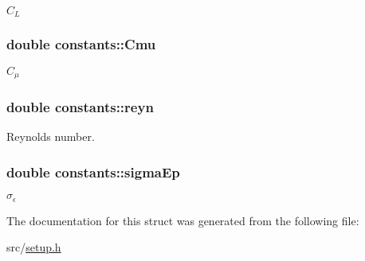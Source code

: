 \label{structconstants_a34749e68de59046dca2df37cc428d07c}
$C_L$ \hypertarget{structconstants_a382f58fd997f76cf1ca691938ad5866e}{
\subsubsection[{Cmu}]{\setlength{\rightskip}{0pt plus 5cm}double {\bf constants::Cmu}}}
\label{structconstants_a382f58fd997f76cf1ca691938ad5866e}
$C_\mu$ \hypertarget{structconstants_a68738fe4ec421ad4e0be4ed19501f15a}{
\subsubsection[{reyn}]{\setlength{\rightskip}{0pt plus 5cm}double {\bf constants::reyn}}}
\label{structconstants_a68738fe4ec421ad4e0be4ed19501f15a}
Reynolds number. \hypertarget{structconstants_ab3ea508d07fee667fcd4dd2331d73634}{
\subsubsection[{sigmaEp}]{\setlength{\rightskip}{0pt plus 5cm}double {\bf constants::sigmaEp}}}
\label{structconstants_ab3ea508d07fee667fcd4dd2331d73634}
$\sigma_\epsilon$ 

The documentation for this struct was generated from the following file:\begin{DoxyCompactItemize}
\item 
src/\hyperlink{setup_8h}{setup.h}\end{DoxyCompactItemize}
